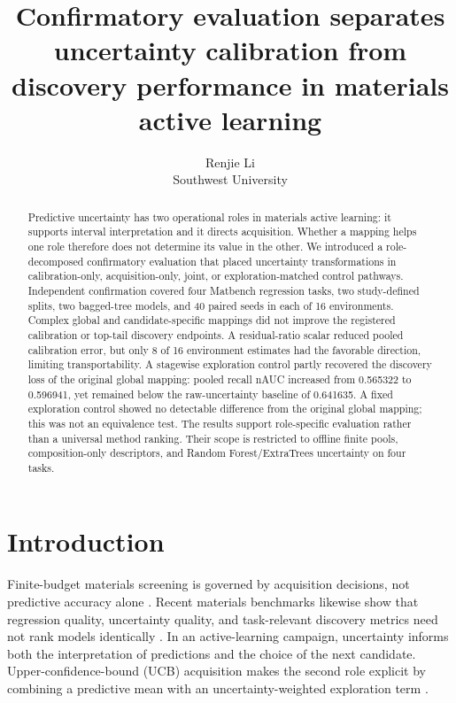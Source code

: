 \documentclass[10pt]{article}
\title{Confirmatory evaluation separates uncertainty calibration from discovery performance in materials active learning}
\author{Renjie Li\\[2pt]\normalsize Southwest University}
\date{}
\begin{document}
\maketitle

\begin{abstract}
Predictive uncertainty has two operational roles in materials active learning:
it supports interval interpretation and it directs acquisition. Whether a
mapping helps one role therefore does not determine its value in the other. We
introduced a role-decomposed confirmatory evaluation that placed uncertainty
transformations in calibration-only, acquisition-only, joint, or
exploration-matched control pathways. Independent confirmation covered four
Matbench regression tasks, two study-defined splits, two bagged-tree models,
and 40 paired seeds in each of 16 environments. Complex global and
candidate-specific mappings did not improve the registered calibration or
top-tail discovery endpoints. A residual-ratio scalar reduced pooled
calibration error, but only 8 of 16 environment estimates had the favorable
direction, limiting transportability. A stagewise exploration control partly
recovered the discovery loss of the original global mapping: pooled recall
nAUC increased from 0.565322 to 0.596941, yet remained below the raw-uncertainty
baseline of 0.641635. A fixed exploration control showed no detectable
difference from the original global mapping; this was not an equivalence test.
The results support role-specific evaluation rather than a universal method
ranking. Their scope is restricted to offline finite pools, composition-only
descriptors, and Random Forest/ExtraTrees uncertainty on four tasks.
\end{abstract}

\section{Introduction}
Finite-budget materials screening is governed by acquisition decisions, not
predictive accuracy alone
\citep{lookman2019active,xue2016adaptive,kusne2020closedloop,rohr2020metrics,hase2021olympus}.
Recent materials benchmarks likewise show that regression quality, uncertainty
quality, and task-relevant discovery metrics need not rank models identically
\citep{varivoda2023uq,riebesell2025matbenchdiscovery}. In an active-learning
campaign, uncertainty informs both the interpretation of predictions and the
choice of the next candidate. Upper-confidence-bound (UCB) acquisition makes
the second role explicit by combining a predictive mean with an
uncertainty-weighted exploration term
\citep{auer2002ucb,srinivas2010gpucb,shahriari2016bo,frazier2018tutorial}.
\end{document}
